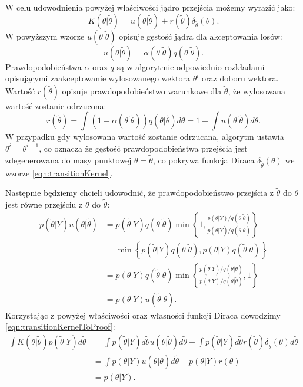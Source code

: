 W celu udowodnienia powyżej właściwości jądro przejścia możemy wyrazić jako:
\begin{equation}
\label{eqn:transitionKernel}
    K(\theta|\widetilde{\theta}) = u(\theta|\widetilde{\theta}) + r(\widetilde{\theta})\delta_{\widetilde{\theta}}(\theta).
\end{equation}
W powyższym wzorze $u(\theta|\widetilde{\theta})$ opisuje gęstość jądra dla akceptowania losów:
\begin{equation}
    u(\theta|\widetilde{\theta}) = \alpha(\theta|\widetilde{\theta})q(\theta|\widetilde{\theta}).
\end{equation}
Prawdopodobieństwa $\alpha$ oraz $q$ są w algorytmie odpowiednio rozkładami opisującymi zaakceptowanie wylosowanego wektora $\theta^i$ oraz doboru wektora. Wartość $r(\widetilde{\theta})$ opisuje prawdopodobieństwo warunkowe dla $\widetilde{\theta}$, że wylosowana wartość zostanie odrzucona:
\begin{equation}
    r(\widetilde{\theta}) = \int (1 - \alpha(\theta|\widetilde{\theta}))q(\theta|\widetilde{\theta})d\theta = 1 - \int u(\theta|\widetilde{\theta})d\theta.
\end{equation}
W przypadku gdy wylosowana wartość zostanie odrzucana, algorytm ustawia $\theta^i = \theta^{i-1}$, co oznacza że gęstość prawdopodobieństwa przejścia jest zdegenerowana do masy punktowej $\theta = \widetilde{\theta}$, co pokrywa funkcja Diraca $\delta_{\widetilde{\theta}}(\theta)$ we wzorze \eqref{eqn:transitionKernel}.

Następnie będziemy chcieli udowodnić, że prawdopodobieństwo przejścia z $\widetilde{\theta}$ do $\theta$ jest równe przejściu z $\theta$ do $\widetilde{\theta}$:
\begin{align}
    p(\widetilde{\theta}|Y)u(\theta|\widetilde{\theta}) &= p(\widetilde{\theta}|Y)q(\theta|\widetilde{\theta})\min\left\{1, \frac{p(\theta|Y)/q(\theta|\widetilde{\theta})}{p(\widetilde{\theta}|Y)/q(\widetilde{\theta}|\theta)}\right\} \\
    &= \min\left\{p(\widetilde{\theta}|Y)q(\theta|\widetilde{\theta}),p(\theta|Y)q(\widetilde{\theta}|\theta)\right\} 
    \\&= p(\theta|Y)q(\widetilde{\theta}|\theta)\min\left\{\frac{p(\widetilde{\theta}|Y)/q(\widetilde{\theta}|\theta)}{p(\theta|Y)/q(\theta|\widetilde{\theta})}, 1\right\} 
    \\&= p(\theta|Y)u(\widetilde{\theta}|\theta).
\end{align}
Korzystając z powyżej właściwości oraz własności funkcji Diraca dowodzimy \eqref{eqn:transitionKernelToProof}:
\begin{align}
    \int K(\theta|\widetilde{\theta})p(\widetilde{\theta}|Y)d\widetilde{\theta} &= 
    \int p(\widetilde{\theta}|Y)d\widetilde{\theta} u(\theta|\widetilde{\theta}) d\widetilde{\theta} + 
    \int p(\widetilde{\theta}|Y)d\widetilde{\theta} r(\widetilde{\theta})\delta_{\widetilde{\theta}}(\theta) d\widetilde{\theta} \\
    &= \int p(\theta|Y) u(\theta|\widetilde{\theta}) d\widetilde{\theta} + p(\theta|Y)r(\theta) \\
    &= p(\theta|Y).
\end{align}

